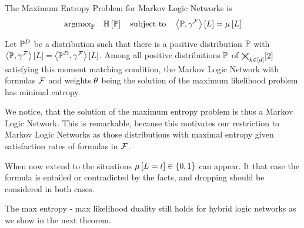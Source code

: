 The Maximum Entropy Problem for Markov Logic Networks is
\begin{align}
	\mathrm{argmax}_{\mathbb{P}} \quad \mathbb{H}\left[\mathbb{P}\right] 
	\quad \text{subject to} \quad  
	\left\langle \mathbb{P},\gamma^{\mathcal{F}}\right\rangle \left[ L \right]
	 =  \mu\left[L\right] 
\end{align}



\begin{corollary}
	Let $\mathbb{P}^{D}$ be a distribution such that there is a positive distribution $\mathbb{P}$ with $\left\langle \mathbb{P},\gamma^{\mathcal{F}}\right\rangle \left[ L \right] = \left\langle \mathbb{P}^{D},\gamma^{\mathcal{F}}\right\rangle \left[ L \right]$.
	Among all positive distributions $\mathbb{P}$ of $\bigtimes_{k\in[d]}[2]$ satisfying this moment matching condition, the Markov Logic Network with formulas $\mathcal{F}$ and weights $\theta$ being the solution of the maximum likelihood problem has minimal entropy.
\end{corollary}

We notice, that the solution of the maximum entropy problem is thus a Markov Logic Network.
This is remarkable, because this motivates our restriction to Markov Logic Networks as those distributions with maximal entropy given satisfaction rates of formulas in $\mathcal{F}$.


When now extend to the situations $\mu\left[L_{}=l_{}\right]\in\{0,1\}$ can appear.
It that case the formula is entailed or contradicted by the facts, and dropping should be considered in both cases.

The max entropy - max likelihood duality still holds for hybrid logic networks as we show in the next theorem.

